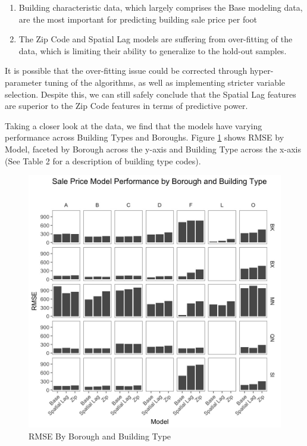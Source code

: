 \documentclass[]{article}
\providecommand{\tightlist}{%
  \setlength{\itemsep}{0pt}\setlength{\parskip}{0pt}}
\begin{document}
\begin{enumerate}
\def\labelenumi{\arabic{enumi})}
\tightlist
\item
  Building characteristic data, which largely comprises the Base
  modeling data, are the most important for predicting building sale
  price per foot
\item
  The Zip Code and Spatial Lag models are suffering from over-fitting of
  the data, which is limiting their ability to generalize to the
  hold-out samples.
\end{enumerate}

It is possible that the over-fitting issue could be corrected through
hyper-parameter tuning of the algorithms, as well as implementing
stricter variable selection. Despite this, we can still safely conclude
that the Spatial Lag features are superior to the Zip Code features in
terms of predictive power.

Taking a closer look at the data, we find that the models have varying
performance across Building Types and Boroughs. Figure
\ref{fig:RMSE by boro and build type} shows RMSE by Model, faceted by
Borough across the y-axis and Building Type across the x-axis (See Table
2 for a description of building type codes).

\begin{figure}[h]
\includegraphics[width=1\linewidth]{Sections/tables and figures/RMSE by boro and build type} \caption{RMSE By Borough and Building Type}\label{fig:RMSE by boro and build type}
\end{figure}
\end{document}
